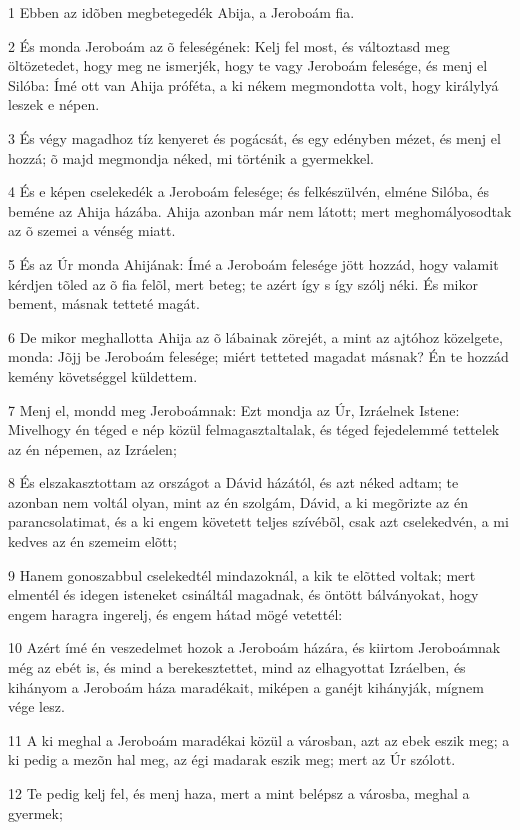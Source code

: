 \par 1 Ebben az idõben megbetegedék Abija, a Jeroboám fia.
\par 2 És monda Jeroboám az õ feleségének: Kelj fel most, és változtasd meg öltözetedet, hogy meg ne ismerjék, hogy te vagy Jeroboám felesége, és menj el Silóba: Ímé ott van Ahija próféta, a ki nékem megmondotta volt, hogy királylyá leszek e népen.
\par 3 És végy magadhoz tíz kenyeret és pogácsát, és egy edényben mézet, és menj el hozzá; õ majd megmondja néked, mi történik a gyermekkel.
\par 4 És e képen cselekedék a Jeroboám felesége; és felkészülvén, elméne Silóba, és beméne az Ahija házába. Ahija azonban már nem látott; mert meghomályosodtak az õ szemei a vénség miatt.
\par 5 És az Úr monda Ahijának: Ímé a Jeroboám felesége jött hozzád, hogy valamit kérdjen tõled az õ fia felõl, mert beteg; te azért így s így szólj néki. És mikor bement, másnak tetteté magát.
\par 6 De mikor meghallotta Ahija az õ lábainak zörejét, a mint az ajtóhoz közelgete, monda: Jõjj be Jeroboám felesége; miért tetteted magadat másnak? Én te hozzád kemény követséggel küldettem.
\par 7 Menj el, mondd meg Jeroboámnak: Ezt mondja az Úr, Izráelnek Istene: Mivelhogy én téged e nép közül felmagasztaltalak, és téged fejedelemmé tettelek az én népemen, az Izráelen;
\par 8 És elszakasztottam az országot a Dávid házától, és azt néked adtam; te azonban nem voltál olyan, mint az én szolgám, Dávid, a ki megõrizte az én parancsolatimat, és a ki engem követett teljes szívébõl, csak azt cselekedvén, a mi kedves az én szemeim elõtt;
\par 9 Hanem gonoszabbul cselekedtél mindazoknál, a kik te elõtted voltak; mert elmentél és idegen isteneket csináltál magadnak, és öntött bálványokat, hogy engem haragra ingerelj, és engem hátad  mögé vetettél:
\par 10 Azért ímé én veszedelmet hozok a Jeroboám házára, és kiirtom Jeroboámnak még az ebét is, és mind a berekesztettet, mind az elhagyottat Izráelben, és kihányom a  Jeroboám háza maradékait, miképen a ganéjt kihányják, mígnem vége lesz.
\par 11 A ki meghal a Jeroboám maradékai közül a városban, azt az ebek eszik meg; a ki pedig a mezõn hal meg, az égi madarak eszik meg; mert az Úr szólott.
\par 12 Te pedig kelj fel, és menj haza, mert a mint belépsz a városba, meghal a gyermek;
